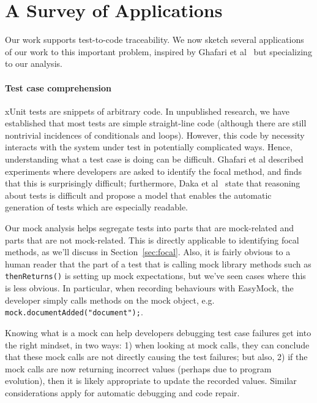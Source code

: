 \section{A Survey of Applications}
\label{sec:applications}

Our work supports test-to-code traceability. 
We now sketch several applications of our work to this important problem,
inspired by Ghafari et al~\cite{ghafari15:_autom} but specializing to
our analysis.

\paragraph{Test case comprehension} xUnit tests are snippets of arbitrary
code. In unpublished research, we have established that most tests are
simple straight-line code (although there are still nontrivial incidences of
conditionals and loops). However, this code by necessity interacts with
the system under test in potentially complicated ways. Hence,
understanding what a test case is doing can be difficult. Ghafari et
al described experiments where developers are asked to identify the
focal method, and finds that this is surprisingly difficult;
furthermore, Daka et al~\cite{daka15:_model_readab_improv_unit_tests}
state that reasoning about tests is difficult and propose a model that
enables the automatic generation of tests which are especially
readable.

Our mock analysis helps segregate tests into parts that are
mock-related and parts that are not mock-related. This is directly applicable
to identifying focal methods, as we'll discuss in Section~\ref{sec:focal}.
Also, it is fairly
obvious to a human reader that the part of a test that is calling mock
library methods such as \texttt{thenReturns()} is setting up mock
expectations, but we've seen cases where this is less
obvious. In particular, when recording behaviours with EasyMock,
the developer simply calls methods on the mock object, e.g. 
\texttt{mock.documentAdded("document");}.

Knowing what is a mock can help developers debugging test case
failures get into the right mindset, in two ways: 1) when looking at
mock calls, they can conclude that these mock calls are not
directly causing the test failures; but also, 2) if the mock calls
are now returning incorrect values (perhaps due to program evolution),
then it is likely appropriate to update the recorded values. Similar considerations
apply for automatic debugging and code repair.

